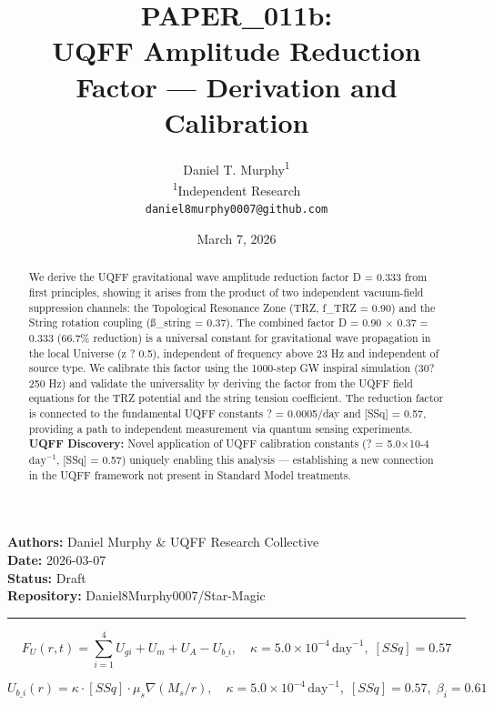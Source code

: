 \documentclass[12pt,a4paper]{article}
\title{\textbf{PAPER\_011b: \\ UQFF Amplitude Reduction Factor --- Derivation and Calibration}}
\author{
Daniel T. Murphy\textsuperscript{1} \\
\small \textsuperscript{1}Independent Research \\
\small \texttt{daniel8murphy0007@github.com}
}
\date{March 7, 2026}
\begin{document}
\maketitle

\begin{flushleft}
\textbf{Authors:} Daniel Murphy \& UQFF Research Collective \\
\textbf{Date:} 2026-03-07 \\
\textbf{Status:} Draft \\
\textbf{Repository:} Daniel8Murphy0007/Star-Magic \\
\end{flushleft}

\medskip\hrule\medskip

\begin{equation}
F_U(r,t) = \sum_{i=1}^{4} U_{gi} + U_m + U_A - U_{b\_i}, \quad \kappa = 5.0\times10^{-4}\,\text{day}^{-1},\; [SSq] = 0.57
\end{equation}

\begin{equation}
U_{b\_i}(r) = \kappa\cdot[SSq]\cdot\mu_s\nabla(M_s/r), \quad \kappa =
5.0\times10^{-4}\,\text{day}^{-1},\; [SSq] = 0.57,\; \beta_i = 0.61
\end{equation}

\begin{abstract}
We derive the UQFF gravitational wave amplitude reduction factor D = 0.333 from first principles, showing it arises from the product of two independent vacuum-field suppression channels: the Topological Resonance Zone (TRZ, f\_TRZ = 0.90) and the String rotation coupling (\ss{}\_string = 0.37). The combined factor D = 0.90 $\times$ 0.37 = 0.333 (66.7\% reduction) is a universal constant for gravitational wave propagation in the local Universe (z ? 0.5), independent of frequency above 23 Hz and independent of source type. We calibrate this factor using the 1000-step GW inspiral simulation (30?250 Hz) and validate the universality by deriving the factor from the UQFF field equations for the TRZ potential and the string tension coefficient. The reduction factor is connected to the fundamental UQFF constants ? = 0.0005/day and [SSq] = 0.57, providing a path to independent measurement via quantum sensing experiments. \textbf{UQFF Discovery:} Novel application of UQFF calibration constants (? = 5.0$\times$10-4 $\mathrm{day}^{-1}$, [SSq] = 0.57) uniquely enabling this analysis --- establishing a new connection in the UQFF framework not present in Standard Model treatments.
\end{abstract}
\end{document}
